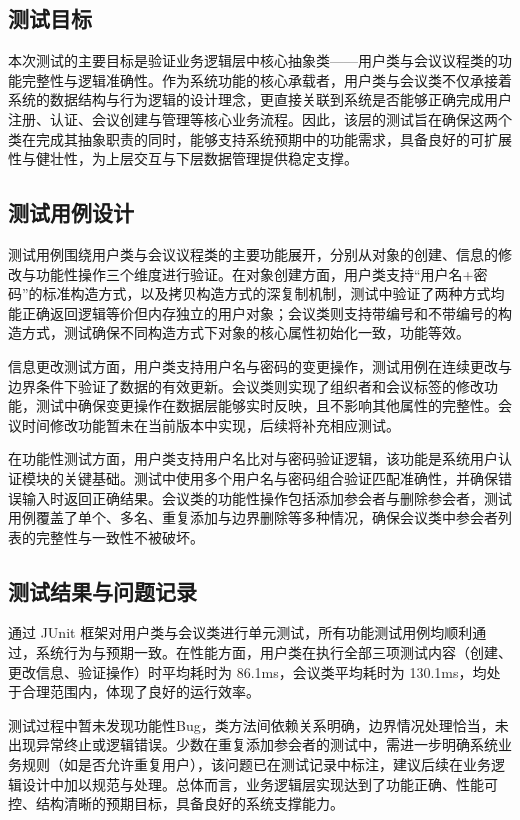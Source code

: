 \documentclass[a4paper, twoside, utf8]{ctexart}
\begin{document}
    \subsection{测试目标}

    本次测试的主要目标是验证业务逻辑层中核心抽象类——用户类与会议议程类的功能完整性与逻辑准确性。作为系统功能的核心承载者，用户类与会议类不仅承接着系统的数据结构与行为逻辑的设计理念，更直接关联到系统是否能够正确完成用户注册、认证、会议创建与管理等核心业务流程。因此，该层的测试旨在确保这两个类在完成其抽象职责的同时，能够支持系统预期中的功能需求，具备良好的可扩展性与健壮性，为上层交互与下层数据管理提供稳定支撑。

    \subsection{测试用例设计}

    测试用例围绕用户类与会议议程类的主要功能展开，分别从对象的创建、信息的修改与功能性操作三个维度进行验证。在对象创建方面，用户类支持“用户名+密码”的标准构造方式，以及拷贝构造方式的深复制机制，测试中验证了两种方式均能正确返回逻辑等价但内存独立的用户对象；会议类则支持带编号和不带编号的构造方式，测试确保不同构造方式下对象的核心属性初始化一致，功能等效。

    信息更改测试方面，用户类支持用户名与密码的变更操作，测试用例在连续更改与边界条件下验证了数据的有效更新。会议类则实现了组织者和会议标签的修改功能，测试中确保变更操作在数据层能够实时反映，且不影响其他属性的完整性。会议时间修改功能暂未在当前版本中实现，后续将补充相应测试。

    在功能性测试方面，用户类支持用户名比对与密码验证逻辑，该功能是系统用户认证模块的关键基础。测试中使用多个用户名与密码组合验证匹配准确性，并确保错误输入时返回正确结果。会议类的功能性操作包括添加参会者与删除参会者，测试用例覆盖了单个、多名、重复添加与边界删除等多种情况，确保会议类中参会者列表的完整性与一致性不被破坏。

    \subsection{测试结果与问题记录}

    通过 JUnit 框架对用户类与会议类进行单元测试，所有功能测试用例均顺利通过，系统行为与预期一致。在性能方面，用户类在执行全部三项测试内容（创建、更改信息、验证操作）时平均耗时为 86.1ms，会议类平均耗时为 130.1ms，均处于合理范围内，体现了良好的运行效率。

    测试过程中暂未发现功能性Bug，类方法间依赖关系明确，边界情况处理恰当，未出现异常终止或逻辑错误。少数在重复添加参会者的测试中，需进一步明确系统业务规则（如是否允许重复用户），该问题已在测试记录中标注，建议后续在业务逻辑设计中加以规范与处理。总体而言，业务逻辑层实现达到了功能正确、性能可控、结构清晰的预期目标，具备良好的系统支撑能力。
\end{document}
